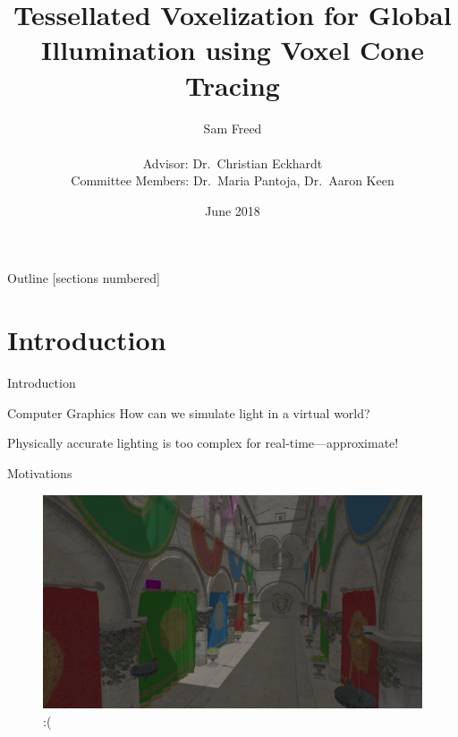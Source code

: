 \documentclass[10pt]{beamer}
\title{Tessellated Voxelization for Global Illumination using Voxel Cone Tracing}
\date{June 2018}
\author{Sam Freed\\\\Advisor: Dr.\ Christian Eckhardt\\Committee Members: Dr.\ Maria Pantoja, Dr.\ Aaron Keen\\}
\institute{California Polytechnic State University, San Luis Obispo}
\begin{document}
{
\begin{frame}[noframenumbering]
  \titlepage
\end{frame}




\begin{frame}[noframenumbering]{Outline}
  [sections numbered]
  \tableofcontents[hideallsubsections]
\end{frame}}


\section{Introduction}
\begin{frame}{Introduction}

  \begin{block}{Computer Graphics}
    How can we simulate light in a virtual world?

    Physically accurate lighting is too complex for real-time---approximate!
  \end{block}
\end{frame}

\begin{frame}{Motivations}
  \begin{figure}
    \includegraphics[width=\textwidth]{gi_off.png}
    \caption*{:(}
  \end{figure}
\end{frame}
\end{document}
